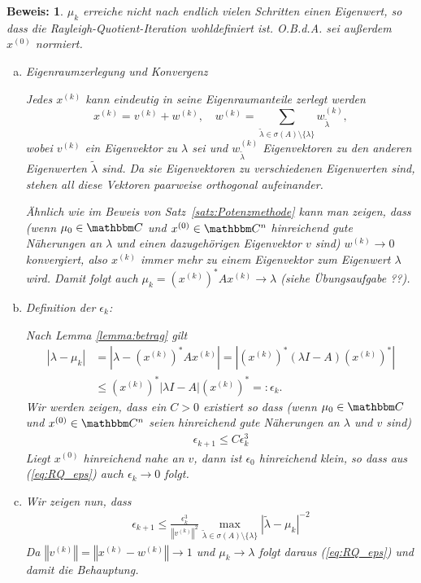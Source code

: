 \documentclass[12pt,a4paper]{book}
\theoremstyle{break}
\theoremstyle{nonumberplain}
\newtheorem{beweis}{Beweis:}
\newcommand{\C}{\mathbbm C}
\newcommand{\norm}[1]{\left\Vert#1\right\Vert}		%
\newcommand{\1}{\mathbbm{1}} 			      	%
\newcommand{\labeq}[1]{\label{eq:#1}}			%
\newcommand{\req}[1]{(\ref{eq:#1})}
\begin{document}
\begin{beweis}
$\mu_k$ erreiche nicht nach endlich vielen Schritten einen Eigenwert, so dass die Rayleigh-Quotient-Iteration wohldefiniert ist.
O.B.d.A. sei außerdem $x^{(0)}$ normiert.

\begin{enumerate}[(a)]

\item Eigenraumzerlegung und Konvergenz

Jedes $x^{(k)}$ kann eindeutig in seine Eigenraumanteile zerlegt werden
\[
x^{(k)}= v^{(k)} + w^{(k)}, \quad w^{(k)}=\sum\limits_{\tilde \lambda\in \sigma(A)\setminus \{\lambda\} } w^{(k)}_{\tilde \lambda},
\]
wobei $v^{(k)}$ ein Eigenvektor zu $\lambda$ sei und $w^{(k)}_{\tilde \lambda}$ Eigenvektoren zu den anderen Eigenwerten $\tilde \lambda$ sind.
Da sie Eigenvektoren zu verschiedenen Eigenwerten sind, stehen all diese Vektoren paarweise orthogonal aufeinander.

Ähnlich wie im Beweis von Satz~\ref{satz:Potenzmethode} kann man zeigen, dass  
(wenn $\mu_0\in \C$ und $x^{(0)}\in \C^n$ hinreichend gute Näherungen an $\lambda$ und einen dazugehörigen Eigenvektor $v$ sind) $w^{(k)}\to 0$ konvergiert, also $x^{(k)}$ immer mehr zu einem Eigenvektor zum Eigenwert $\lambda$ wird.
Damit folgt auch $\mu_k=(x^{(k)})^* A x^{(k)}\to \lambda$ (siehe Übungsaufgabe ??).

\item Definition der $\epsilon_k$:

Nach Lemma \ref{lemma:betrag} gilt 
\begin{align*}
|\lambda - \mu_{k} | &= | \lambda - (x^{(k)})^* A x^{(k)} | = | (x^{(k)})^* (\lambda I - A ) (x^{(k)})^*|\\
&\leq  (x^{(k)})^* |\lambda I - A | (x^{(k)})^*=:\epsilon_k.
\end{align*}
Wir werden zeigen, dass ein $C>0$ existiert so dass (wenn $\mu_0\in \C$ und $x^{(0)}\in \C^n$ seien hinreichend gute Näherungen an $\lambda$ und $v$ sind)
\begin{align}\labeq{RQ_eps}
\epsilon_{k+1}\leq C \epsilon_{k}^3
\end{align}
Liegt $x^{(0)}$ hinreichend nahe an $v$, dann ist $\epsilon_0$ hinreichend klein, so dass aus \req{RQ_eps} auch $\epsilon_k\to 0$ folgt.

\item Wir zeigen nun, dass
\begin{align}\labeq{RQ_hilf}
\epsilon_{k+1} \leq  \frac{\epsilon_k^3}{\norm{v^{(k)}}^2} \max\limits_{ \tilde \lambda\in \sigma(A)\setminus \{\lambda\} } |\tilde\lambda-\mu_k|^{-2}
\end{align}
Da $\norm{v^{(k)}}=\norm{x^{(k)}-w^{(k)}} \to 1$ und $\mu_k\to \lambda$ folgt daraus \req{RQ_eps} und damit die Behauptung.


\end{enumerate}
\end{beweis}
\end{document}
